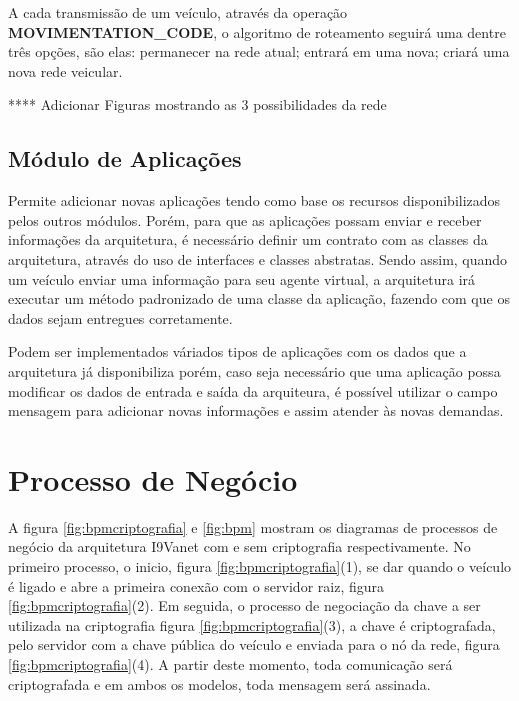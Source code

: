 \documentclass[
	12pt,				%
	oneside,			%
	a4paper,			%
	english,			%
	brazil				%
	]{abntex2ppgsi}
\begin{document}
A cada transmissão de um veículo, através da operação \textbf{MOVIMENTATION\_CODE}, o algoritmo de roteamento seguirá uma dentre três opções, são elas: permanecer na rede atual; entrará em uma nova; criará uma nova rede veicular.



**** Adicionar Figuras mostrando as 3 possibilidades da rede

\subsection{Módulo de Aplicações}
Permite adicionar novas aplicações tendo como base os recursos disponibilizados pelos outros módulos. Porém, para que as aplicações possam enviar e receber informações da arquitetura, é necessário definir um contrato com as classes da arquitetura, através do uso de interfaces e classes abstratas. Sendo assim, quando um veículo enviar uma informação para seu agente virtual, a arquitetura irá executar um método padronizado de uma classe da aplicação, fazendo com que os dados sejam entregues corretamente.

Podem ser implementados váriados tipos de aplicações com os dados que a arquitetura já disponibiliza porém, caso seja necessário que uma aplicação possa modificar os dados de entrada e saída da arquiteura, é possível utilizar o campo mensagem para adicionar novas informações e assim atender às novas demandas.

\section{Processo de Negócio}

A figura \ref{fig:bpmcriptografia} e \ref{fig:bpm} mostram os diagramas de processos de negócio da arquitetura I9Vanet com e sem criptografia respectivamente. No primeiro processo, o inicio, figura \ref{fig:bpmcriptografia}(1), se dar quando o veículo é ligado e abre a primeira conexão com o servidor raiz, figura \ref{fig:bpmcriptografia}(2). Em seguida, o processo de negociação da chave a ser utilizada na criptografia figura \ref{fig:bpmcriptografia}(3), a chave é criptografada, pelo servidor com a chave pública do veículo e enviada  para o nó da rede, figura \ref{fig:bpmcriptografia}(4). A partir deste momento, toda comunicação será criptografada e em ambos os modelos, toda mensagem será assinada. 
\end{document}
